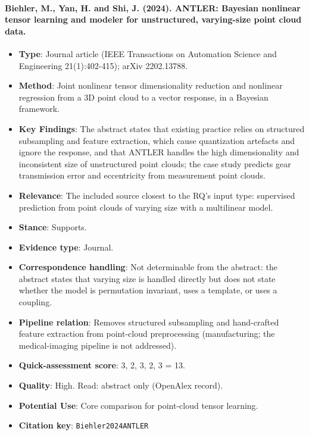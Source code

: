 \documentclass[journal,onecolumn]{IEEEtran}
\begin{document}
\paragraph{Biehler, M., Yan, H. and Shi, J. (2024). ANTLER: Bayesian nonlinear tensor learning and modeler for unstructured, varying-size point cloud data.~\cite{Biehler2024ANTLER}}\mbox{}

\begin{itemize}

\item{} \textbf{Type}: Journal article (IEEE Transactions on Automation Science and Engineering 21(1):402-415); arXiv 2202.13788.

\item{} \textbf{Method}: Joint nonlinear tensor dimensionality reduction and nonlinear regression from a 3D point cloud to a vector response, in a Bayesian framework.

\item{} \textbf{Key Findings}: The abstract states that existing practice relies on structured subsampling and feature extraction, which cause quantization artefacts and ignore the response, and that ANTLER handles the high dimensionality and inconsistent size of unstructured point clouds; the case study predicts gear transmission error and eccentricity from measurement point clouds.

\item{} \textbf{Relevance}: The included source closest to the RQ's input type: supervised prediction from point clouds of varying size with a multilinear model.

\item{} \textbf{Stance}: Supports.

\item{} \textbf{Evidence type}: Journal.

\item{} \textbf{Correspondence handling}: Not determinable from the abstract: the abstract states that varying size is handled directly but does not state whether the model is permutation invariant, uses a template, or uses a coupling.

\item{} \textbf{Pipeline relation}: Removes structured subsampling and hand-crafted feature extraction from point-cloud preprocessing (manufacturing; the medical-imaging pipeline is not addressed).

\item{} \textbf{Quick-assessment score}: 3, 2, 3, 2, 3 = 13.

\item{} \textbf{Quality}: High. Read: abstract only (OpenAlex record).

\item{} \textbf{Potential Use}: Core comparison for point-cloud tensor learning.

\item{} \textbf{Citation key}: \texttt{Biehler2024ANTLER}

\end{itemize}
\end{document}
